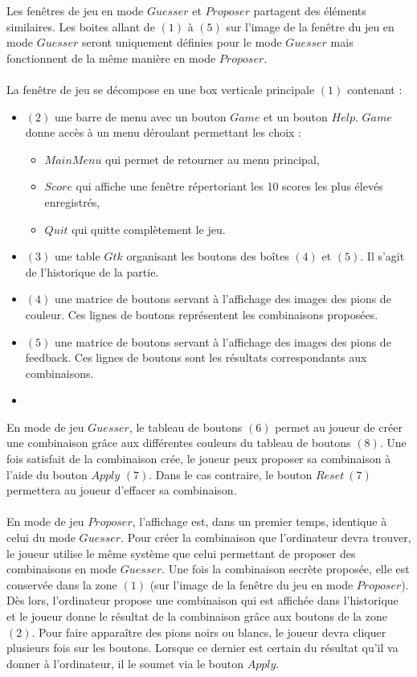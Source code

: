 Les fenêtres de jeu en mode $Guesser$ et $Proposer$ partagent des éléments similaires. Les boites allant de $(1)$ à $(5)$ sur l'image de la fenêtre du jeu en mode $Guesser$ seront uniquement définies pour le mode $Guesser$ mais fonctionnent de la même manière en mode $Proposer$.
\\\\
La fenêtre de jeu se décompose en une box verticale principale $(1)$ contenant :

\begin{itemize}
    \item $(2)$ une barre de menu avec un bouton $Game$ et un bouton $Help$. $Game$ donne accès à un menu déroulant permettant les choix :
    \begin{itemize}
        \item $Main Menu$ qui permet de retourner au menu principal,
        \item $Score$ qui affiche une fenêtre répertoriant les 10 scores les plus élevés enregistrés,
        \item $Quit$ qui quitte complètement le jeu.
    \end{itemize}
    \item $(3)$ une table $Gtk$ organisant les boutons des boîtes $(4)$ et $(5)$. Il s'agit de l'historique de la partie.
    \item $(4)$ une matrice de boutons servant à l'affichage des images des pions de couleur. Ces lignes de boutons représentent les combinaisons proposées.
    \item $(5)$ une matrice de boutons servant à l'affichage des images des pions de feedback. Ces lignes de boutons sont les résultats correspondants aux combinaisons.
    \item[]
\end{itemize}

En mode de jeu $Guesser$, le tableau de boutons $(6)$ permet au joueur de créer une combinaison grâce aux différentes couleurs du tableau de boutons $(8)$. Une fois satisfait de la combinaison crée, le joueur peux proposer sa combinaison à l'aide du bouton $Apply$ $(7)$. Dans le cas contraire, le bouton $Reset~(7)$ permettera au joueur d'effacer sa combinaison. 
\\\\
En mode de jeu $Proposer$, l'affichage est, dans un premier temps, identique à celui du mode $Guesser$. Pour créer la combinaison que l'ordinateur devra trouver, le joueur utilise le même système que celui permettant de proposer des combinaisons en mode $Guesser$. Une fois la combinaison secrète proposée, elle est conservée dans la zone $(1)$ (sur l'image de la fenêtre du jeu en mode $Proposer$). Dès lors, l'ordinateur propose une combinaison qui est affichée dans l'historique et le joueur donne le résultat de la combinaison grâce aux boutons de la zone $(2)$. Pour faire apparaître des pions noirs ou blancs, le joueur devra cliquer plusieurs fois sur les boutons. Lorsque ce dernier est certain du résultat qu'il va donner à l'ordinateur, il le soumet via le bouton $Apply$.

